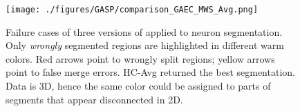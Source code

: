 





\begin{figure}[tp]
\centering
\texttt{[image: ./figures/GASP/comparison\_GAEC\_MWS\_Avg.png]} %
\caption{Failure cases of three versions of \algname{} applied to neuron segmentation. Only \emph{wrongly} segmented regions are highlighted in different warm colors. Red arrows point to wrongly split regions; yellow arrows point to false merge errors. HC-Avg returned the best segmentation. Data is 3D, hence the same color could be assigned to parts of segments that appear disconnected in 2D.  
\label{fig:failure_cases}}
\end{figure}








